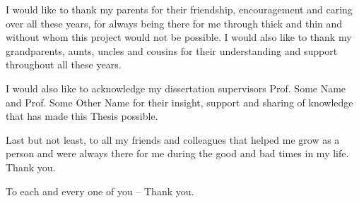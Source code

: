 
I would like to thank my parents for their friendship, encouragement and caring over all these years, for always being there for me through thick and thin and without whom this project would not be possible. I would also like to thank my grandparents, aunts, uncles and cousins for their understanding and support throughout all these years.

I would also like to acknowledge my dissertation supervisors Prof. Some Name and Prof. Some Other Name for their insight, support and sharing of knowledge that has made this Thesis possible.

Last but not least, to all my friends and colleagues that helped me grow as a person and were always there for me during the good and bad times in my life. Thank you.

To each and every one of you -- Thank you.





